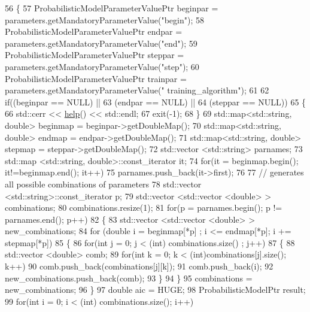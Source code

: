 \begin{DoxyCode}
56   \{
57     ProbabilisticModelParameterValuePtr beginpar = parameters.getMandatoryParameterValue(\textcolor{stringliteral}{"begin"});
58     ProbabilisticModelParameterValuePtr endpar = parameters.getMandatoryParameterValue(\textcolor{stringliteral}{"end"});
59     ProbabilisticModelParameterValuePtr steppar = parameters.getMandatoryParameterValue(\textcolor{stringliteral}{"step"});
60     ProbabilisticModelParameterValuePtr trainpar = parameters.getMandatoryParameterValue(\textcolor{stringliteral}{"
      training\_algorithm"});
61 
62     \textcolor{keywordflow}{if}((beginpar == NULL) ||
63        (endpar == NULL) ||
64        (steppar == NULL))
65       \{
66         std::cerr << \hyperlink{classtops_1_1AkaikeInformationCriteria_ab0460e83a273c2e87f5009bd3a1177fd}{help}() << std::endl;
67         exit(-1);
68       \}
69     std::map<std::string, double> beginmap = beginpar->getDoubleMap();
70     std::map<std::string, double> endmap = endpar->getDoubleMap();
71     std::map<std::string, double> stepmap = steppar->getDoubleMap();
72     std::vector <std::string> parnames;
73     std::map <std::string, double>::const\_iterator it;
74     \textcolor{keywordflow}{for}(it = beginmap.begin(); it!=beginmap.end(); it++)
75       parnames.push\_back(it->first);
76 
77     \textcolor{comment}{// generates all possible combinations of parameters}
78     std::vector <std::string>::const\_iterator p;
79     std::vector <std::vector <double> > combinations;
80     combinations.resize(1);
81     \textcolor{keywordflow}{for}(p = parnames.begin(); p != parnames.end(); p++)
82       \{
83         std::vector <std::vector <double> > new\_combinations;
84         \textcolor{keywordflow}{for} (\textcolor{keywordtype}{double} i = beginmap[*p] ; i <= endmap[*p]; i += stepmap[*p])
85           \{
86             \textcolor{keywordflow}{for}(\textcolor{keywordtype}{int} j = 0; j < (int) combinations.size() ; j++)
87               \{
88                 std::vector <double> comb;
89                 \textcolor{keywordflow}{for}(\textcolor{keywordtype}{int} k = 0; k < (int)combinations[j].size(); k++)
90                   comb.push\_back(combinations[j][k]);
91                 comb.push\_back(i);
92                 new\_combinations.push\_back(comb);
93               \}
94           \}
95         combinations = new\_combinations;
96       \}
97     \textcolor{keywordtype}{double} aic = HUGE;
98     ProbabilisticModelPtr result;
99     \textcolor{keywordflow}{for}(\textcolor{keywordtype}{int} i = 0; i < (int) combinations.size(); i++)

\end{DoxyCode}
